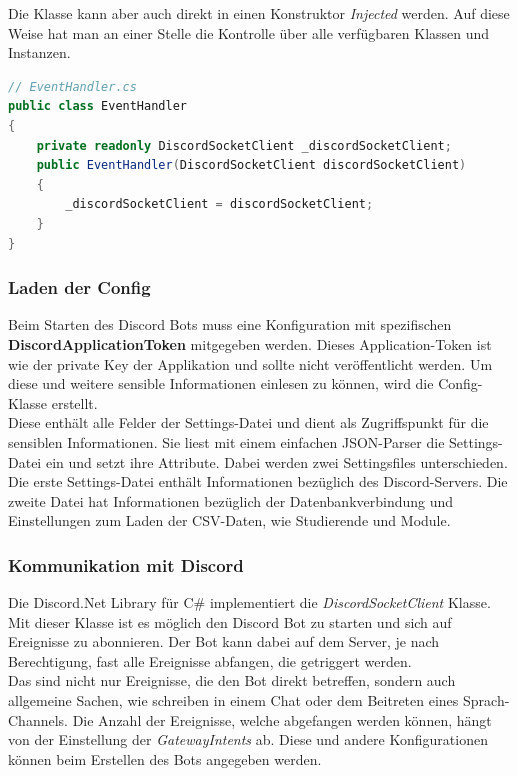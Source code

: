 \documentclass[a4paper, table]{article}
\begin{document}
Die Klasse kann aber auch direkt in einen Konstruktor \textit{Injected} werden.
Auf diese Weise hat man an einer Stelle die Kontrolle über alle verfügbaren Klassen und Instanzen.
\begin{lstlisting}[language=csharp]
// EventHandler.cs
public class EventHandler
{
    private readonly DiscordSocketClient _discordSocketClient;
    public EventHandler(DiscordSocketClient discordSocketClient)
    {
        _discordSocketClient = discordSocketClient;
    }
}
\end{lstlisting}

\subsubsection*{Laden der Config}
Beim Starten des Discord Bots muss eine Konfiguration mit spezifischen \textbf{DiscordApplicationToken} mitgegeben werden.
Dieses Application-Token ist wie der private Key der Applikation und sollte nicht veröffentlicht werden. 
Um diese und weitere sensible Informationen einlesen zu können, wird die Config-Klasse erstellt.\\
Diese enthält alle Felder der Settings-Datei und dient als Zugriffspunkt für die sensiblen Informationen. 
Sie liest mit einem einfachen \gls{JSON}-Parser die Settings-Datei ein und setzt ihre Attribute. 
Dabei werden zwei Settingsfiles unterschieden. 
Die erste Settings-Datei enthält Informationen bezüglich des Discord-Servers. 
Die zweite Datei hat Informationen bezüglich der Datenbankverbindung und Einstellungen zum Laden der \gls{CSV}-Daten, wie Studierende und Module.

\subsubsection{Kommunikation mit Discord}
Die Discord.Net Library für C\# implementiert die \textit{DiscordSocketClient} Klasse.
Mit dieser Klasse ist es möglich den Discord Bot zu starten und sich auf Ereignisse zu abonnieren.
Der Bot kann dabei auf dem Server, je nach Berechtigung, fast alle Ereignisse abfangen, die getriggert werden. \\
Das sind nicht nur Ereignisse, die den Bot direkt betreffen, sondern auch allgemeine Sachen, wie schreiben in einem Chat oder dem Beitreten eines Sprach-Channels.
Die Anzahl der Ereignisse, welche abgefangen werden können, hängt von der Einstellung der \textit{GatewayIntents} ab.
Diese und andere Konfigurationen können beim Erstellen des Bots angegeben werden.
\end{document}
